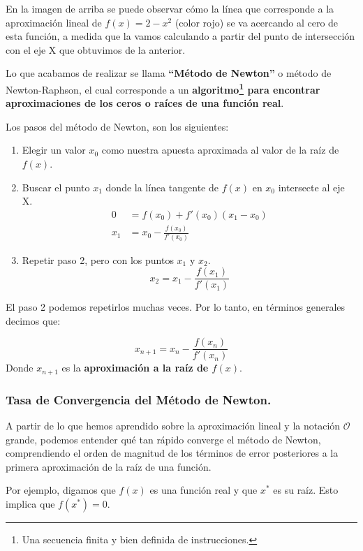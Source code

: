\documentclass[12pt]{article}
\begin{document}
En la imagen de arriba se puede observar cómo la línea que corresponde a la aproximación lineal de $f(x) = 2 - x^{2}$ (color rojo) se va acercando al cero de esta función, a medida que la vamos calculando a partir del punto de intersección con el eje X que obtuvimos de la anterior.

Lo que acabamos de realizar se llama \textbf{``Método de Newton''} o método de Newton-Raphson, el cual corresponde a un \textbf{algoritmo\footnote{Una secuencia finita y bien definida de instrucciones.} para encontrar aproximaciones de los ceros o raíces de una función real}.

Los pasos del método de Newton, son los siguientes:

\begin{enumerate}
\item Elegir un valor $x_{0}$ como nuestra apuesta aproximada al valor de la raíz de $f(x)$.

\item Buscar el punto $x_{1}$ donde la línea tangente de $f(x)$ en $x_{0}$ intersecte al eje X.
\begin{align*}
0 &= f(x_{0}) + f'(x_{0})(x_{1} - x_{0}) \\
x_{1} &= x_{0} - \frac{f(x_{0})}{f'(x_{0})}
\end{align*}
\item Repetir paso 2, pero con los puntos $x_{1}$ y $x_{2}$.
\[
	x_{2} = x_{1} - \frac{f(x_{1})}{f'(x_{1})}
\]
\end{enumerate}

El paso 2 podemos repetirlos muchas veces. Por lo tanto, en términos generales decimos que:

\newpage

\[x_{n + 1} = x_{n} - \frac{f(x_{n})}{f'(x_{n})}\]
Donde $x_{n + 1}$ es la \textbf{aproximación a la raíz de $f(x)$}.


\subsubsection{Tasa de Convergencia del Método de Newton.}

A partir de lo que hemos aprendido sobre la aproximación lineal y la notación $\mathcal{O}$ grande, podemos entender qué tan rápido converge el método de Newton, comprendiendo el orden de magnitud de los términos de error posteriores a la primera aproximación de la raíz de una función.

Por ejemplo, digamos que $f(x)$ es una función real y que $x^{*}$ es su raíz. Esto implica que $f(x^{*}) = 0$.
\end{document}
